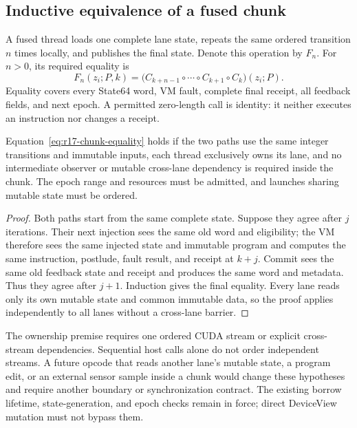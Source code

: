 \subsection{Inductive equivalence of a fused chunk}

A fused thread loads one complete lane state, repeats the same ordered
transition $n$ times locally, and publishes the final state. Denote
this operation by $F_n$. For $n>0$, its required equality is
\begin{equation}
 F_n(z_i;P,k)=
 \bigl(C_{k+n-1}\circ\cdots\circ C_{k+1}\circ C_k\bigr)(z_i;P).
 \label{eq:r17-chunk-equality}
\end{equation}
Equality covers every State64 word, VM fault, complete final receipt,
all feedback fields, and next epoch. A permitted zero-length call is
identity: it neither executes an instruction nor changes a receipt.

\begin{proposition}
Equation~\eqref{eq:r17-chunk-equality} holds if the two paths use the
same integer transitions and immutable inputs, each thread exclusively
owns its lane, and no intermediate observer or mutable cross-lane
dependency is required inside the chunk. The epoch range and resources
must be admitted, and launches sharing mutable state must be ordered.
\end{proposition}
\begin{proof}
Both paths start from the same complete state. Suppose they agree
after $j$ iterations. Their next injection sees the same old word and
eligibility; the VM therefore sees the same injected state and immutable
program and computes the same instruction, postlude, fault result, and
receipt at $k+j$. Commit sees the same old feedback state and receipt
and produces the same word and metadata. Thus they agree after $j+1$.
Induction gives the final equality. Every lane reads only its own mutable
state and common immutable data, so the proof applies independently to
all lanes without a cross-lane barrier.
\end{proof}

The ownership premise requires one ordered CUDA stream or explicit
cross-stream dependencies. Sequential host calls alone do not order
independent streams. A future opcode that reads another lane's mutable
state, a program edit, or an external sensor sample inside a chunk would
change these hypotheses and require another boundary or synchronization
contract. The existing borrow lifetime, state-generation, and epoch
checks remain in force; direct DeviceView mutation must not bypass them.


